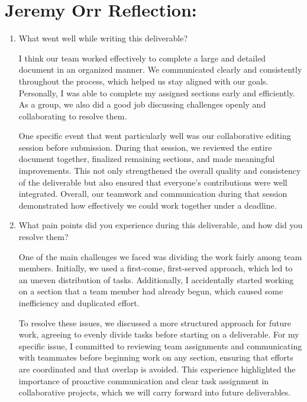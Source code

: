 \section{Jeremy Orr Reflection:}

\begin{enumerate}
 \item What went well while writing this deliverable?

    \par{I think our team worked effectively to complete a large and detailed document in an organized manner. We communicated clearly and consistently throughout the process, which helped us stay aligned with our goals. Personally, I was able to complete my assigned sections early and efficiently. As a group, we also did a good job discussing challenges openly and collaborating to resolve them.}

    \par{One specific event that went particularly well was our collaborative editing session before submission. During that session, we reviewed the entire document together, finalized remaining sections, and made meaningful improvements. This not only strengthened the overall quality and consistency of the deliverable but also ensured that everyone’s contributions were well integrated. Overall, our teamwork and communication during that session demonstrated how effectively we could work together under a deadline.}

  \item What pain points did you experience during this deliverable, and how did you resolve them?

    \par{One of the main challenges we faced was dividing the work fairly among team members. Initially, we used a first-come, first-served approach, which led to an uneven distribution of tasks. Additionally, I accidentally started working on a section that a team member had already begun, which caused some inefficiency and duplicated effort.}

    \par{To resolve these issues, we discussed a more structured approach for future work, agreeing to evenly divide tasks before starting on a deliverable. For my specific issue, I committed to reviewing team assignments and communicating with teammates before beginning work on any section, ensuring that efforts are coordinated and that overlap is avoided. This experience highlighted the importance of proactive communication and clear task assignment in collaborative projects, which we will carry forward into future deliverables.}


\end{enumerate}
